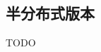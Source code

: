 \documentclass[a4paper,11pt,         %
               ]{article}
\begin{document}
\subsection{半分布式版本}
TODO



\end{document}
